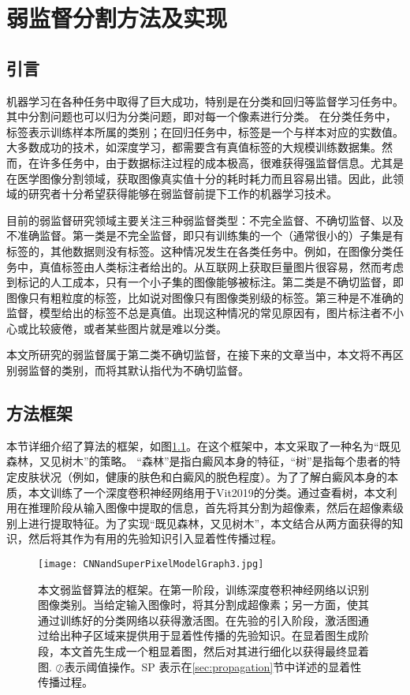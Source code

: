 
\chapter{弱监督分割方法及实现}
\section{引言}
机器学习在各种任务中取得了巨大成功，特别是在分类和回归等监督学习任务中。其中分割问题也可以归为分类问题，即对每一个像素进行分类。
在分类任务中，标签表示训练样本所属的类别；在回归任务中，标签是一个与样本对应的实数值。大多数成功的技术，如深度学习，都需要含有真值标签的大规模训练数据集。然而，在许多任务中，由于数据标注过程的成本极高，很难获得强监督信息。尤其是在医学图像分割领域，获取图像真实值十分的耗时耗力而且容易出错。因此，此领域的研究者十分希望获得能够在弱监督前提下工作的机器学习技术。

目前的弱监督研究领域主要关注三种弱监督类型：不完全监督、不确切监督、以及不准确监督。第一类是不完全监督，即只有训练集的一个（通常很小的）子集是有标签的，其他数据则没有标签。这种情况发生在各类任务中。例如，在图像分类任务中，真值标签由人类标注者给出的。从互联网上获取巨量图片很容易，然而考虑到标记的人工成本，只有一个小子集的图像能够被标注。第二类是不确切监督，即图像只有粗粒度的标签，比如说对图像只有图像类别级的标签。第三种是不准确的监督，模型给出的标签不总是真值。出现这种情况的常见原因有，图片标注者不小心或比较疲倦，或者某些图片就是难以分类。

本文所研究的弱监督属于第二类不确切监督，在接下来的文章当中，本文将不再区别弱监督的类别，而将其默认指代为不确切监督。

\section{方法框架}
本节详细介绍了算法的框架，如图\ref{fig:framework}。在这个框架中，本文采取了一种名为“既见森林，又见树木”的策略。 “森林”是指白癜风本身的特征，“树”是指每个患者的特定皮肤状况（例如，健康的肤色和白癜风的脱色程度）。为了了解白癜风本身的本质，本文训练了一个深度卷积神经网络用于Vit2019的分类。通过查看树，本文利用在推理阶段从输入图像中提取的信息，首先将其分割为超像素，然后在超像素级别上进行提取特征。为了实现“既见森林，又见树木”，本文结合从两方面获得的知识，然后将其作为有用的先验知识引入显着性传播过程。
\begin{figure}[htbp]
\begin{center}
\texttt{[image: CNNandSuperPixelModelGraph3.jpg]}
\end{center}
   \caption{本文弱监督算法的框架。在第一阶段，训练深度卷积神经网络以识别图像类别。当给定输入图像时，将其分割成超像素；另一方面，使其通过训练好的分类网络以获得激活图。在先验的引入阶段，激活图通过给出种子区域来提供用于显着性传播的先验知识。在显着图生成阶段，本文首先生成一个粗显着图，然后对其进行细化以获得最终显着图. $ \oslash $表示阈值操作。SP 表示在\ref{sec:propagation}节中详述的显着性传播过程。}
\label{fig:framework}
\end{figure}


